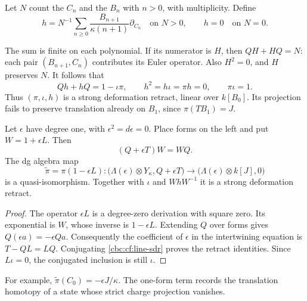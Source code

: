 Let $N$ count the $C_n$ and the $B_n$ with $n>0$,
with multiplicity. Define
\begin{equation}\label{cbc:cf:line-h}
 h=N^{-1}\sum_{n\geq0}
       \frac{B_{n+1}}{\kappa(n+1)}\partial_{C_n}
 \quad\text{on }N>0,\qquad h=0\quad\text{on }N=0.
\end{equation}

The sum is finite on each polynomial. If its numerator is $H$,
then $QH+HQ=N$: each pair $(B_{n+1},C_n)$ contributes
its Euler operator. Also $H^2=0$, and $H$ preserves $N$.
It follows that
\begin{equation}\label{cbc:cf:line-sdr}
 Qh+hQ=1-\iota\pi,\qquad
 h^2=h\iota=\pi h=0,\qquad \pi\iota=1.
\end{equation}
Thus $(\pi,\iota,h)$ is a strong deformation retract,
linear over $k[B_0]$. Its projection fails to preserve
translation already on $B_1$, since $\pi(TB_1)=J$.

\begin{proposition}\label{cbc:cf:cartan}
Let $\epsilon$ have degree one, with $\epsilon^2=d\epsilon=0$.
Place forms on the left and put $W=1+\epsilon L$.
Then
\[
 (Q+\epsilon T)W=WQ.
\]
The dg algebra map
\[
 \widetilde\pi=\pi(1-\epsilon L):
 \bigl(\Lambda(\epsilon)\otimes Y_\kappa,Q+\epsilon T\bigr)
 \longrightarrow
 \bigl(\Lambda(\epsilon)\otimes k[J],0\bigr)
\]
is a quasi-isomorphism. Together with $\iota$ and
$WhW^{-1}$ it is a strong deformation retract.
\end{proposition}
\begin{proof}
The operator $\epsilon L$ is a degree-zero derivation with square
zero. Its exponential is $W$, whose inverse is $1-\epsilon L$.
Extending $Q$ over forms gives $Q(\epsilon a)=-\epsilon Qa$.
Consequently the coefficient of $\epsilon$ in the intertwining
equation is $T-QL=LQ$. Conjugating
\eqref{cbc:cf:line-sdr} proves the retract identities.
Since $L\iota=0$, the conjugated inclusion is still $\iota$.
\end{proof}

For example,
$\widetilde\pi(C_0)=-\epsilon J/\kappa$.
The one-form term records the translation homotopy of a state
whose strict charge projection vanishes.

